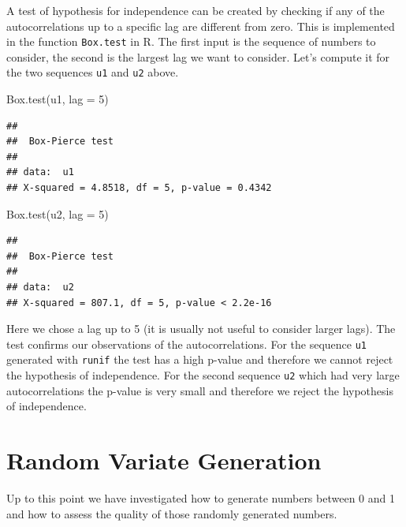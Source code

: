 \documentclass[
]{book}
\newenvironment{Shaded}{\begin{snugshade}}{\end{snugshade}}
\newcommand{\AttributeTok}[1]{\textcolor[rgb]{0.77,0.63,0.00}{#1}}
\newcommand{\DecValTok}[1]{\textcolor[rgb]{0.00,0.00,0.81}{#1}}
\newcommand{\FunctionTok}[1]{\textcolor[rgb]{0.00,0.00,0.00}{#1}}
\newcommand{\NormalTok}[1]{#1}
\begin{document}
A test of hypothesis for independence can be created by checking if any of the autocorrelations up to a specific lag are different from zero. This is implemented in the function \texttt{Box.test} in R. The first input is the sequence of numbers to consider, the second is the largest lag we want to consider. Let's compute it for the two sequences \texttt{u1} and \texttt{u2} above.

\begin{Shaded}
\begin{Highlighting}[]
\FunctionTok{Box.test}\NormalTok{(u1, }\AttributeTok{lag =} \DecValTok{5}\NormalTok{)}
\end{Highlighting}
\end{Shaded}

\begin{verbatim}
## 
##  Box-Pierce test
## 
## data:  u1
## X-squared = 4.8518, df = 5, p-value = 0.4342
\end{verbatim}

\begin{Shaded}
\begin{Highlighting}[]
\FunctionTok{Box.test}\NormalTok{(u2, }\AttributeTok{lag =} \DecValTok{5}\NormalTok{)}
\end{Highlighting}
\end{Shaded}

\begin{verbatim}
## 
##  Box-Pierce test
## 
## data:  u2
## X-squared = 807.1, df = 5, p-value < 2.2e-16
\end{verbatim}

Here we chose a lag up to 5 (it is usually not useful to consider larger lags). The test confirms our observations of the autocorrelations. For the sequence \texttt{u1} generated with \texttt{runif} the test has a high p-value and therefore we cannot reject the hypothesis of independence. For the second sequence \texttt{u2} which had very large autocorrelations the p-value is very small and therefore we reject the hypothesis of independence.

\hypertarget{random-variate-generation}{%
\section{Random Variate Generation}\label{random-variate-generation}}

Up to this point we have investigated how to generate numbers between 0 and 1 and how to assess the quality of those randomly generated numbers.
\end{document}
